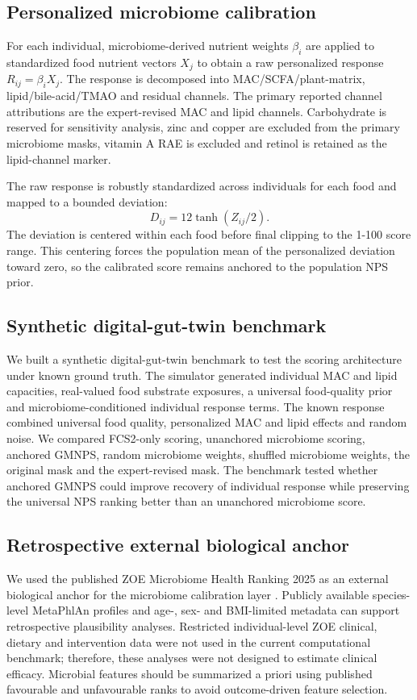 \subsection*{Personalized microbiome calibration}

For each individual, microbiome-derived nutrient weights \(\beta_i\) are applied
to standardized food nutrient vectors \(X_j\) to obtain a raw personalized
response \(R_{ij} = \beta_i X_j\). The response is decomposed into
MAC/SCFA/plant-matrix, lipid/bile-acid/TMAO and residual channels. The primary
reported channel attributions are the expert-revised MAC and lipid channels.
Carbohydrate is reserved for sensitivity analysis, zinc and copper are excluded
from the primary microbiome masks, vitamin A RAE is excluded and retinol is
retained as the lipid-channel marker.

The raw response is robustly standardized across individuals for each food and
mapped to a bounded deviation:
\[
  D_{ij} = 12 \tanh(Z_{ij}/2).
\]
The deviation is centered within each food before final clipping to the 1-100
score range. This centering forces the population mean of the personalized
deviation toward zero, so the calibrated score remains anchored to the
population NPS prior.

\subsection*{Synthetic digital-gut-twin benchmark}

We built a synthetic digital-gut-twin benchmark to test the scoring architecture
under known ground truth. The simulator generated individual MAC and lipid
capacities, real-valued food substrate exposures, a universal food-quality
prior and microbiome-conditioned individual response terms. The known response
combined universal food quality, personalized MAC and lipid effects and random
noise. We compared FCS2-only scoring, unanchored microbiome scoring, anchored
GMNPS, random microbiome weights, shuffled microbiome weights, the original
mask and the expert-revised mask. The benchmark tested whether anchored GMNPS
could improve recovery of individual response while preserving the universal
NPS ranking better than an unanchored microbiome score.

\subsection*{Retrospective external biological anchor}

We used the published ZOE Microbiome Health Ranking 2025 as an external
biological anchor for the microbiome calibration layer
\cite{asnicar2025gut}. Publicly available species-level MetaPhlAn profiles and
age-, sex- and BMI-limited metadata can support retrospective plausibility
analyses. Restricted individual-level ZOE clinical, dietary and intervention
data were not used in the current computational benchmark; therefore, these
analyses were not designed to estimate clinical efficacy. Microbial features
should be summarized a priori using published favourable and unfavourable ranks
to avoid outcome-driven feature selection.
